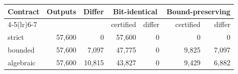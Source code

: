 \begin{tabular}{lrrrrrr}
\toprule
Contract & Outputs & Differ & \multicolumn{2}{c}{Bit-identical} & \multicolumn{2}{c}{Bound-preserving}\\
\cmidrule(lr){4-5}\cmidrule(lr){6-7}
 & & & certified & differ & certified & differ\\
\midrule
strict & 57,600 & 0 & 57,600 & 0 & 0 & 0\\
bounded & 57,600 & 7,097 & 47,775 & 0 & 9,825 & 7,097\\
algebraic & 57,600 & 10,815 & 43,827 & 0 & 9,429 & 6,882\\
\bottomrule
\end{tabular}

